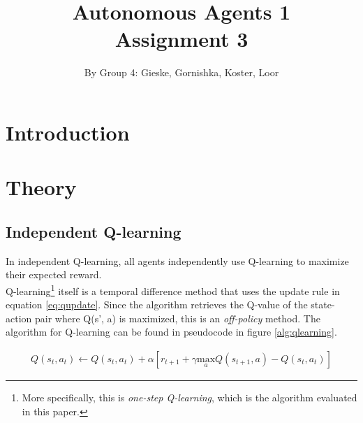 \documentclass{article}
\begin{document}
\title{Autonomous Agents 1 \\ Assignment 3}

\author{By Group 4: Gieske, Gornishka, Koster, Loor}
\maketitle

\pagebreak
\tableofcontents


\pagebreak

\section{Introduction}



\pagebreak

\section{Theory}

\subsection{Independent Q-learning}
In independent Q-learning, all agents independently use Q-learning to maximize their expected reward.  \\ 

\noindent Q-learning\footnote{More specifically, this is \textit{one-step Q-learning}, which is the algorithm evaluated in this paper.} itself is a temporal difference method that uses the update rule in equation \eqref{eq:qupdate}. Since the algorithm retrieves the Q-value of the state-action pair where Q(s', a) is maximized, this is an \textit{off-policy} method. The algorithm for Q-learning can be found in pseudocode in figure \ref{alg:qlearning}.

\begin{mdframed}
\begin{align}
Q(s_t, a_t) \leftarrow Q(s_t,a_t) + \alpha \left[ r_{t+1} + \gamma \underset{a}{\text{max}} Q(s_{t+1},a) - Q(s_t,a_t)\right]\label{eq:qupdate}
\end{align}
\end{mdframed}
\end{document}
